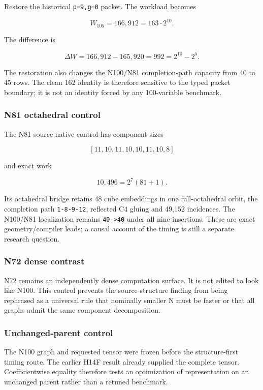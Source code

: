 Restore the historical \texttt{p=9,g=0} packet. The workload becomes

\[
W_{105}=166{,}912=163\cdot2^{10}.
\]

The difference is

\[
\Delta W=166{,}912-165{,}920=992=2^{10}-2^5.
\]

The restoration also changes the N100/N81 completion-path capacity from
40 to 45 rows. The clean 162 identity is therefore sensitive to the
typed packet boundary; it is not an identity forced by any 100-variable
benchmark.

\subsubsection{N81 octahedral control}\label{viii-ch01-n81-octahedral-control}

The N81 source-native control has component sizes

\[
[11,10,11,10,10,11,10,8]
\]

and exact work

\[
10{,}496=2^7(81+1).
\]

Its octahedral bridge retains 48 cube embeddings in one full-octahedral
orbit, the completion path \texttt{1-8-9-12}, reflected C4 gluing and
49,152 incidences. The N100/N81 localization remains
\texttt{40-\textgreater{}40} under all nine insertions. These are exact
geometry/compiler leads; a causal account of the timing is still a
separate research question.

\subsubsection{N72 dense contrast}\label{viii-ch01-n72-dense-contrast}

N72 remains an independently dense computation surface. It is not edited
to look like N100. This control prevents the source-structure finding
from being rephrased as a universal rule that nominally smaller N must
be faster or that all graphs admit the same component decomposition.

\subsubsection{Unchanged-parent control}\label{viii-ch01-unchanged-parent-control}

The N100 graph and requested tensor were frozen before the
structure-first timing route. The earlier H14F result already supplied
the complete tensor. Coefficientwise equality therefore tests an
optimization of representation on an unchanged parent rather than a
retuned benchmark.

